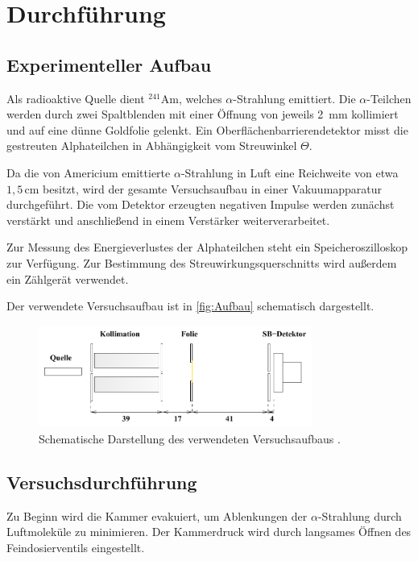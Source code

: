 \section{Durchführung}
\subsection*{Experimenteller Aufbau}

Als radioaktive Quelle dient $^{241}\mathrm{Am}$, welches $\alpha$-Strahlung emittiert. Die $\alpha$-Teilchen werden durch zwei Spaltblenden mit einer Öffnung von jeweils 2 $\, \unit{\milli \meter}$ kollimiert und auf eine dünne Goldfolie gelenkt. Ein Oberflächenbarrierendetektor misst die gestreuten Alphateilchen in Abhängigkeit vom Streuwinkel $\Theta$. 

Da die von Americium emittierte $\alpha$-Strahlung in Luft eine Reichweite von etwa $1,5 \, \unit{\centi \meter}$ besitzt, wird der gesamte Versuchsaufbau in einer Vakuumapparatur durchgeführt. Die vom Detektor erzeugten negativen Impulse werden zunächst verstärkt und anschließend in einem Verstärker weiterverarbeitet. 

Zur Messung des Energieverlustes der Alphateilchen steht ein Speicheroszilloskop zur Verfügung. Zur Bestimmung des Streuwirkungsquerschnitts wird außerdem ein Zählgerät verwendet.

Der verwendete Versuchsaufbau ist in \autoref{fig:Aufbau} schematisch dargestellt.
\begin{figure}
	\centering
	\includegraphics[width=0.8\textwidth]{content/grafik/Aufbau.pdf}
	\caption{Schematische Darstellung des verwendeten Versuchsaufbaus \cite{rutherford}.}
	\label{fig:Aufbau}
\end{figure}

\subsection*{Versuchsdurchführung}

Zu Beginn wird die Kammer evakuiert, um Ablenkungen der $\alpha$-Strahlung durch Luftmoleküle zu minimieren. Der Kammerdruck wird durch langsames Öffnen des Feindosierventils eingestellt.

